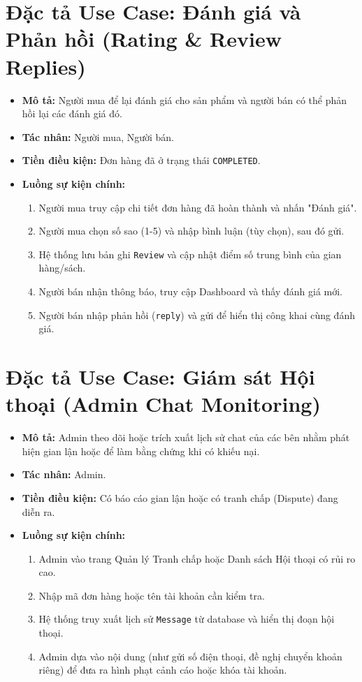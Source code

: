 \documentclass[../main.tex]{subfiles}
\begin{document}
\section{Đặc tả Use Case: Đánh giá và Phản hồi (Rating \& Review Replies)}
\begin{itemize}
    \item \textbf{Mô tả:} Người mua để lại đánh giá cho sản phẩm và người bán có thể phản hồi lại các đánh giá đó.
    \item \textbf{Tác nhân:} Người mua, Người bán.
    \item \textbf{Tiền điều kiện:} Đơn hàng đã ở trạng thái \texttt{COMPLETED}.
    \item \textbf{Luồng sự kiện chính:}
        \begin{enumerate}
            \item Người mua truy cập chi tiết đơn hàng đã hoàn thành và nhấn "Đánh giá".
            \item Người mua chọn số sao (1-5) và nhập bình luận (tùy chọn), sau đó gửi.
            \item Hệ thống lưu bản ghi \texttt{Review} và cập nhật điểm số trung bình của gian hàng/sách.
            \item Người bán nhận thông báo, truy cập Dashboard và thấy đánh giá mới.
            \item Người bán nhập phản hồi (\texttt{reply}) và gửi để hiển thị công khai cùng đánh giá.
        \end{enumerate}
\end{itemize}

\section{Đặc tả Use Case: Giám sát Hội thoại (Admin Chat Monitoring)}
\begin{itemize}
    \item \textbf{Mô tả:} Admin theo dõi hoặc trích xuất lịch sử chat của các bên nhằm phát hiện gian lận hoặc để làm bằng chứng khi có khiếu nại.
    \item \textbf{Tác nhân:} Admin.
    \item \textbf{Tiền điều kiện:} Có báo cáo gian lận hoặc có tranh chấp (Dispute) đang diễn ra.
    \item \textbf{Luồng sự kiện chính:}
        \begin{enumerate}
            \item Admin vào trang Quản lý Tranh chấp hoặc Danh sách Hội thoại có rủi ro cao.
            \item Nhập mã đơn hàng hoặc tên tài khoản cần kiểm tra.
            \item Hệ thống truy xuất lịch sử \texttt{Message} từ database và hiển thị đoạn hội thoại.
            \item Admin dựa vào nội dung (như gửi số điện thoại, đề nghị chuyển khoản riêng) để đưa ra hình phạt cảnh cáo hoặc khóa tài khoản.
        \end{enumerate}
\end{itemize}
\end{document}
